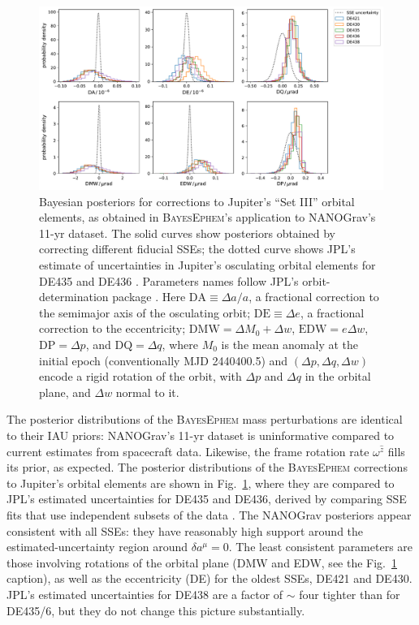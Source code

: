 \documentclass{aastex63}
\begin{document}
\begin{figure}[t]
    \includegraphics[width=\columnwidth]{figures/setIII-posteriors.pdf}
    \caption{Bayesian posteriors for corrections to Jupiter's ``Set III'' orbital elements, as obtained in \textsc{BayesEphem}'s application to NANOGrav's 11-yr dataset. The solid curves show posteriors obtained by correcting different fiducial SSEs; the dotted curve shows JPL's estimate of uncertainties in Jupiter's osculating orbital elements for DE435 and DE436 \citep{de434}.
    Parameters names follow JPL's orbit-determination package \citep{moyer2003}. %
    Here $\mathrm{DA} \equiv \Delta a/a$, a fractional correction to the semimajor axis of the osculating orbit; $\mathrm{DE} \equiv \Delta e$, a fractional correction to the eccentricity; $\mathrm{DMW} = \Delta M_0 + \Delta w$, $\mathrm{EDW} = e \Delta w$, $\mathrm{DP} = \Delta p$, and $\mathrm{DQ} = \Delta q$, where $M_0$ is the mean anomaly at the initial epoch (conventionally MJD 2440400.5) and $(\Delta p, \Delta q, \Delta w)$ encode a rigid rotation of the orbit, with $\Delta p$ and $\Delta q$ in the orbital plane, and $\Delta w$ normal to it.}
    \label{fig:setIIIposteriors}
\end{figure}

The posterior distributions of the \textsc{BayesEphem} mass perturbations are identical to their IAU priors:  NANOGrav's 11-yr dataset is uninformative compared to current estimates from spacecraft data. Likewise, the frame rotation rate $\omega^{\hat{z}}$ fills its prior, as expected.
The posterior distributions of the \textsc{BayesEphem} corrections to Jupiter's orbital elements are shown in Fig.\ \ref{fig:setIIIposteriors}, where they are compared to JPL's estimated uncertainties for DE435 and DE436, derived by comparing SSE fits that use independent subsets of the data \citep{de434}. The NANOGrav posteriors appear consistent with all SSEs: they have reasonably high support around the estimated-uncertainty region around $\delta a^\mu = 0$. The least consistent parameters are those involving rotations of the orbital plane (DMW and EDW, see the Fig.\ \ref{fig:setIIIposteriors} caption), as well as the eccentricity (DE) for the oldest SSEs, DE421 and DE430. JPL's estimated uncertainties for DE438 are a factor of $\sim$ four tighter than for DE435/6, but they do not change this picture substantially.
\end{document}
